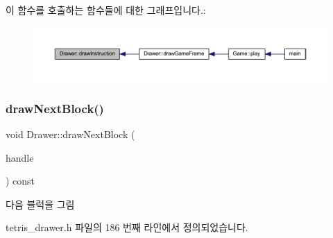 이 함수를 호출하는 함수들에 대한 그래프입니다.\+:
\nopagebreak
\begin{figure}[H]
\begin{center}
\leavevmode
\includegraphics[width=350pt]{class_drawer_a4fb74bcad295250c519bb848dd48b0de_icgraph}
\end{center}
\end{figure}
\mbox{\label{class_drawer_a6d8f74fa5fae96990547abb2521b5432}} 
\subsubsection{\texorpdfstring{draw\+Next\+Block()}{drawNextBlock()}}
{\footnotesize\ttfamily void Drawer\+::draw\+Next\+Block (\begin{DoxyParamCaption}\item[{const \mbox{\hyperlink{class_block_handler}{Block\+Handler}} \&}]{handle }\end{DoxyParamCaption}) const\hspace{0.3cm}{\ttfamily [inline]}}



다음 블럭을 그림 



tetris\+\_\+drawer.\+h 파일의 186 번째 라인에서 정의되었습니다.


